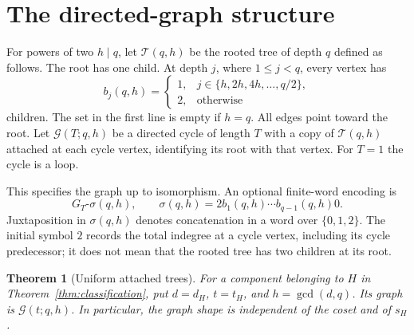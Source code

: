 \documentclass[11pt]{article}
\newtheorem{theorem}{Theorem}[section]
\theoremstyle{definition}
\theoremstyle{remark}
\numberwithin{equation}{section}
\newcommand{\G}{\mathcal G}
\begin{document}
\section{The directed-graph structure}\label{sec:trees}

For powers of two $h\mid q$, let $\mathcal T(q,h)$ be the rooted tree of
depth $q$ defined as follows. The root has one child. At depth $j$, where
$1\le j<q$, every vertex has
\begin{equation}\label{eq:branching}
 b_j(q,h)=
 \begin{cases}
 1,&j\in\{h,2h,4h,\ldots,q/2\},\\
 2,&\text{otherwise}
 \end{cases}
\end{equation}
children. The set in the first line is empty if $h=q$. All edges point
toward the root. Let $\G(T;q,h)$ be a directed cycle of length $T$ with
a copy of $\mathcal T(q,h)$ attached at each cycle vertex, identifying its
root with that vertex. For $T=1$ the cycle is a loop.

This specifies the graph up to isomorphism. An optional finite-word
encoding is
\begin{equation}\label{eq:branching-sequence}
 G_T\text{-}\sigma(q,h),\qquad
 \sigma(q,h)=2b_1(q,h)\cdots b_{q-1}(q,h)0.
\end{equation}
Juxtaposition in $\sigma(q,h)$ denotes concatenation in a word over $\{0,1,2\}$. The initial
symbol $2$ records the total indegree at a cycle vertex, including
its cycle predecessor; it does not mean that the rooted tree has two
children at its root.

\begin{theorem}[Uniform attached trees]\label{thm:trees}
For a component belonging to $H$ in Theorem~\ref{thm:classification}, put
$d=d_H$, $t=t_H$, and $h=\gcd(d,q)$. Its graph is $\G(t;q,h)$.
In particular, the graph shape is independent of the coset and of $s_H$.
\end{theorem}
\end{document}
